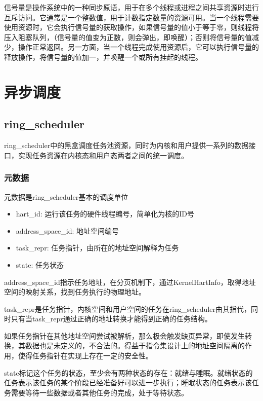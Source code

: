 信号量是操作系统中的一种同步原语，用于在多个线程或进程之间共享资源时进行互斥访问。它通常是一个整数值，用于计数指定数量的资源可用。当一个线程需要使用资源时，它会执行信号量的获取操作，如果信号量的值小于等于零，则线程将压入阻塞队列，（信号量的值变为正数，则会弹出，即唤醒）；否则将信号量的值减少，操作正常返回。另一方面，当一个线程完成使用资源后，它可以执行信号量的释放操作，将信号量的值加一，并唤醒一个或所有挂起的线程。

\section{异步调度}

\subsection{ring\_scheduler}


ring\_scheduler中的黑盒调度任务池资源，同时为内核和用户提供一系列的数据接口，实现任务资源在内核态和用户态两者之间的统一调度。

\subsubsection{元数据}

元数据是ring\_scheduler基本的调度单位

\begin{itemize}
\item hart\_id: 运行该任务的硬件线程编号，简单化为核的ID号
\item address\_space\_id: 地址空间编号
\item task\_repr: 任务指针，由所在的地址空间解释为任务
\item state: 任务状态
\end{itemize}


address\_space\_id指示任务地址，在分页机制下，通过KernelHartInfo，取得地址空间的映射关系，找到任务执行的物理地址。

task\_repr是任务指针，内核空间和用户空间的任务在ring\_scheduler由其指代，同时只有当task\_repr通过正确的地址转换才能得到正确的任务结构。

如果任务指针在其他地址空间尝试被解析，那么极会触发缺页异常，即使发生转换，其数据也是未定义的，不合法的。得益于指令集设计上的地址空间隔离的作用，使得任务指针在实现上存在一定的安全性。


state标记这个任务的状态，至少会有两种状态的存在：就绪与睡眠。就绪状态的任务表示该任务的某个阶段已经准备好可以进一步执行；睡眠状态的任务表示该任务需要等待一些数据或者其他任务的完成，处于等待状态。

